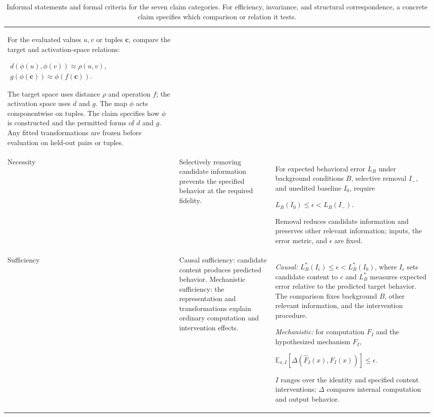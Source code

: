 \documentclass[11pt]{article}
\newcommand{\E}{\mathbb{E}}
\begin{document}
\begin{table}[H]
\begin{tabularx}{\textwidth}{@{}>{\raggedright\arraybackslash}p{22mm}>{\raggedright\arraybackslash}p{48mm}>{\raggedright\arraybackslash}X@{}}
For the evaluated values $u,v$ or tuples $\mathbf c$, compare the target and activation-space relations:
\par $\displaystyle \begin{gathered}d\!\left(\phi(u),\phi(v)\right)\approx\rho(u,v),\\ g\!\left(\phi(\mathbf c)\right)\approx\phi\!\left(f(\mathbf c)\right).\end{gathered}$
\par The target space uses distance $\rho$ and operation $f$; the activation space uses $d$ and $g$.
The map $\phi$ acts componentwise on tuples.
The claim specifies how $\phi$ is constructed and the permitted forms of $d$ and $g$.
Any fitted transformations are frozen before evaluation on held-out pairs or tuples. \\
\addlinespace[1.5pt]
Necessity & Selectively removing candidate information prevents the specified behavior at the required fidelity.
& For expected behavioral error $L_B$ under background conditions $B$, selective removal $I_-$, and unedited baseline $I_0$, require
\par $\displaystyle L_B(I_0)\leq\epsilon<L_B(I_-)$.
\par Removal reduces candidate information and preserves other relevant information; inputs, the error metric, and $\epsilon$ are fixed. \\
\addlinespace[1.5pt]
Sufficiency & Causal sufficiency: candidate content produces predicted behavior.
Mechanistic sufficiency: the representation and transformations explain ordinary computation and intervention effects.
& \emph{Causal:} $L_B^*(I_c)\leq\epsilon<L_B^*(I_0)$, where $I_c$ sets candidate content to $c$ and $L_B^*$ measures expected error relative to the predicted target behavior.
The comparison fixes background $B$, other relevant information, and the intervention procedure.
\par \emph{Mechanistic:} for computation $F_I$ and the hypothesized mechanism $\widehat F_I$,
\par $\displaystyle \E_{x,I}\!\left[\Delta\!\left(\widehat F_I(x),F_I(x)\right)\right]\leq\epsilon$.
\par $I$ ranges over the identity and specified content interventions; $\Delta$ compares internal computation and output behavior. \\
\bottomrule
\end{tabularx}
\caption{Informal statements and formal criteria for the seven claim categories.
For efficiency, invariance, and structural correspondence, a concrete claim specifies which comparison or relation it tests.}
\label{tab:claim-criteria}
\end{table}
\end{document}
